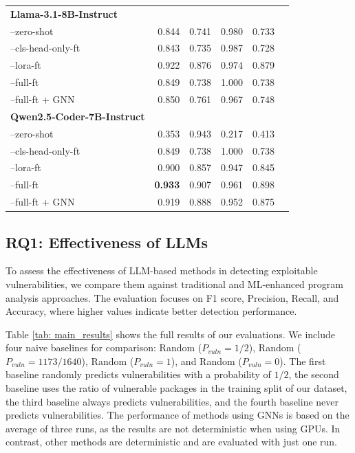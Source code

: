 \documentclass[12pt,openany,oneside,table]{cmuthesis}
\begin{document}
\begin{table}[!t]
{\begin{tabular}{lrrrrr}
    \textbf{Llama-3.1-8B-Instruct} &\cellcolor[HTML]{A8A8A8} &\cellcolor[HTML]{A8A8A8} &\cellcolor[HTML]{A8A8A8} &\cellcolor[HTML]{A8A8A8} \\
    --zero-shot &0.844 &0.741 &0.980 &0.733 \\
    --cls-head-only-ft &0.843 &0.735 &0.987 &0.728 \\
    --lora-ft &0.922 &0.876 &0.974 &0.879 \\
    --full-ft &0.849 &0.738 &1.000 &0.738 \\
    --full-ft + GNN &0.850 &0.761 &0.967 &0.748 \\

    \textbf{Qwen2.5-Coder-7B-Instruct} &\cellcolor[HTML]{A8A8A8} &\cellcolor[HTML]{A8A8A8} &\cellcolor[HTML]{A8A8A8} &\cellcolor[HTML]{A8A8A8} \\
    --zero-shot &0.353 &0.943 &0.217 &0.413 \\
    --cls-head-only-ft &0.849 &0.738 &1.000 &0.738 \\
    --lora-ft &0.900 &0.857 &0.947 &0.845 \\
    --full-ft &\textbf{0.933} &0.907 &0.961 &0.898 \\
    --full-ft + GNN &0.919 &0.888 &0.952 &0.875 \\
    \bottomrule
    \end{tabular}
    }
\end{table}

\subsection{RQ1: Effectiveness of LLMs}

To assess the effectiveness of LLM-based methods in detecting exploitable vulnerabilities, we compare them against traditional and ML-enhanced program analysis approaches. The evaluation focuses on F1 score, Precision, Recall, and Accuracy, where higher values indicate better detection performance.

Table \ref{tab: main_results} shows the full results of our evaluations. We include four naive baselines for comparison: Random ($P_\textit{vuln}=1/2$), Random ($P_\textit{vuln}=1173/1640$), Random ($P_\textit{vuln}=1$), and Random ($P_{vuln}=0$). The first baseline randomly predicts vulnerabilities with a probability of $1/2$, the second baseline uses the ratio of vulnerable packages in the training split of our dataset, the third baseline always predicts vulnerabilities, and the fourth baseline never predicts vulnerabilities. The performance of methods using GNNs is based on the average of three runs, as the results are not deterministic when using GPUs. In contrast, other methods are deterministic and are evaluated with just one run.
\end{document}
